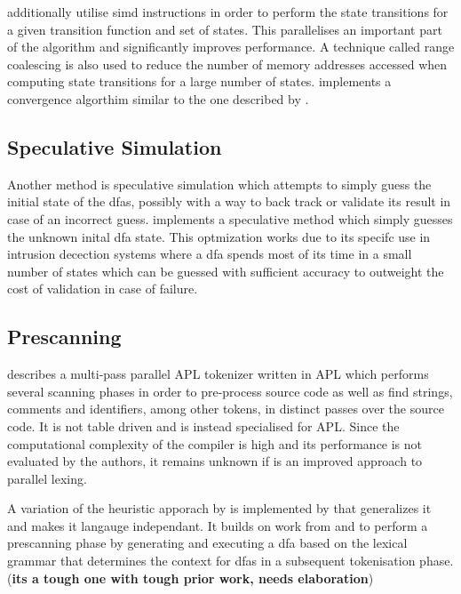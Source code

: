 \cite{mytkowicz_data-parallel_2014} additionally utilise \gls{simd} instructions
in order to perform the state transitions for a given transition function
and set of states. This parallelises an important part of the algorithm and
significantly improves performance. A technique called range coalescing is
also used to reduce the number of memory addresses accessed when computing
state transitions for a large number of states. \cite{zhao_--fly_2015}
implements a convergence algorthim similar to the one described by
\cite{mytkowicz_data-parallel_2014}.

\subsection{Speculative Simulation} \label{speculative_simulation}

Another method is speculative simulation which attempts to simply guess the
initial state of the \gls{dfa}s, possibly with a way to back track or validate
its result in case of an incorrect guess. \cite{luchaup_multi-byte_2009,
luchaup_speculative_2011} implements a speculative method which simply guesses
the unknown inital \gls{dfa} state. This optmization works due to its specifc
use in intrusion decection systems where a \gls{dfa} spends most of its time
in a small number of states which can be guessed with sufficient accuracy to
outweight the cost of validation in case of failure.

\subsection{Prescanning} \label{lit_prescanning}

\cite{bernecky_spmdsimd_2003} describes a multi-pass parallel APL tokenizer
written in APL which performs several scanning phases in order to pre-process
source code as well as find strings, comments and identifiers, among other
tokens, in distinct passes over the source code. It is not table driven and is
instead specialised for APL. Since the computational complexity of the compiler
is high and its performance is not evaluated by the authors, it remains unknown
if is an improved approach to parallel lexing.

A variation of the heuristic apporach by \cite{barenghi_parallel_2015} is
implemented by \cite{li_plex_2021} that generalizes it and makes it langauge
independant. It builds on work from \cite{sinya_simultaneous_2013} and
\cite{zhao_--fly_2015} to perform a prescanning phase by generating and
executing a \gls{dfa} based on the lexical grammar that determines the context
for \glspl{dfa} in a subsequent tokenisation phase. (\textbf{its a tough one
with tough prior work, needs elaboration})


